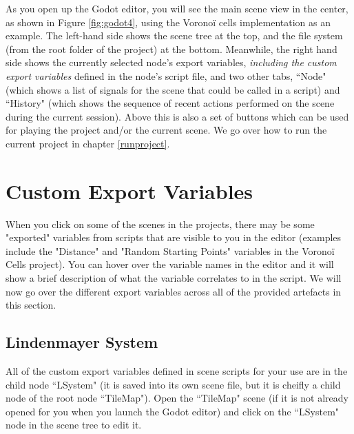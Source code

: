 As you open up the Godot editor, you will see the main scene view in the center, as shown in Figure \ref{fig:godot4}, using the Voronoï cells implementation as an example. The left-hand side shows the scene tree at the top, and the file system (from the root folder of the project) at the bottom. Meanwhile, the right hand side shows the currently selected node's export variables, \textit{including the custom export variables} defined in the node's script file, and two other tabs, ``Node" (which shows a list of signals for the scene that could be called in a script) and ``History" (which shows the sequence of recent actions performed on the scene during the current session). Above this is also a set of buttons which can be used for playing the project and/or the current scene. We go over how to run the current project in chapter \ref{runproject}.

\section{Custom Export Variables} 

When you click on some of the scenes in the projects, there may be some "exported" variables from scripts that are visible to you in the editor (examples include the "Distance" and "Random Starting Points" variables in the Voronoï Cells project). You can hover over the variable names in the editor and it will show a brief description of what the variable correlates to in the script. We will now go over the different export variables across all of the provided artefacts in this section.

\subsection{Lindenmayer System}

All of the custom export variables defined in scene scripts for your use are in the child node ``LSystem" (it is saved into its own scene file, but it is cheifly a child node of the root node ``TileMap"). Open the ``TileMap" scene (if it is not already opened for you when you launch the Godot editor) and click on the ``LSystem" node in the scene tree to edit it.

